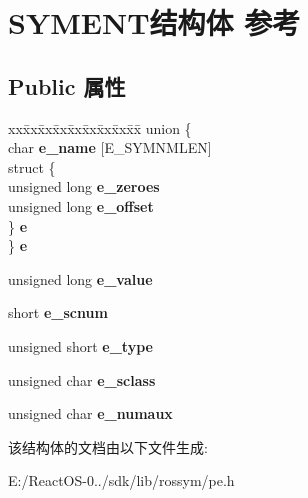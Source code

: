 \hypertarget{struct_s_y_m_e_n_t}{}\section{S\+Y\+M\+E\+N\+T结构体 参考}
\label{struct_s_y_m_e_n_t}
\subsection*{Public 属性}
\begin{DoxyCompactItemize}
\item 
\mbox{\label{struct_s_y_m_e_n_t_a5de3277eb04439213920b82336cf4493}} 
\begin{tabbing}
xx\=xx\=xx\=xx\=xx\=xx\=xx\=xx\=xx\=\kill
union \{\\
\>char {\bfseries e\_name} \mbox{[}E\_SYMNMLEN\mbox{]}\\
\>struct \{\\
\>\>unsigned long {\bfseries e\_zeroes}\\
\>\>unsigned long {\bfseries e\_offset}\\
\>\} {\bfseries e}\\
\} {\bfseries e}\\

\end{tabbing}\item 
\mbox{\label{struct_s_y_m_e_n_t_a974c4ff6ab0d06785de971ea7cfcbca4}} 
unsigned long {\bfseries e\+\_\+value}
\item 
\mbox{\label{struct_s_y_m_e_n_t_af3594ff9a4c3c357513b3d222b5ed99a}} 
short {\bfseries e\+\_\+scnum}
\item 
\mbox{\label{struct_s_y_m_e_n_t_acddfe26251d9b10427785024ea6f8e23}} 
unsigned short {\bfseries e\+\_\+type}
\item 
\mbox{\label{struct_s_y_m_e_n_t_a899590394721f3d7e4725f9e31f9fb3b}} 
unsigned char {\bfseries e\+\_\+sclass}
\item 
\mbox{\label{struct_s_y_m_e_n_t_af8311c14d26050dbc6fad384bb5edda4}} 
unsigned char {\bfseries e\+\_\+numaux}
\end{DoxyCompactItemize}


该结构体的文档由以下文件生成\+:\begin{DoxyCompactItemize}
\item 
E\+:/\+React\+O\+S-\/0../sdk/lib/rossym/pe.\+h\end{DoxyCompactItemize}
